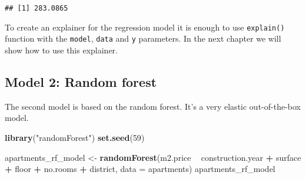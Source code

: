 \documentclass[]{book}
\newenvironment{Shaded}{\begin{snugshade}}{\end{snugshade}}
\newcommand{\DataTypeTok}[1]{\textcolor[rgb]{0.13,0.29,0.53}{#1}}
\newcommand{\DecValTok}[1]{\textcolor[rgb]{0.00,0.00,0.81}{#1}}
\newcommand{\KeywordTok}[1]{\textcolor[rgb]{0.13,0.29,0.53}{\textbf{#1}}}
\newcommand{\NormalTok}[1]{#1}
\newcommand{\OperatorTok}[1]{\textcolor[rgb]{0.81,0.36,0.00}{\textbf{#1}}}
\newcommand{\StringTok}[1]{\textcolor[rgb]{0.31,0.60,0.02}{#1}}
\theoremstyle{definition}
\theoremstyle{definition}
\theoremstyle{definition}
\theoremstyle{remark}
\begin{document}
\begin{Shaded}
\end{Shaded}

\begin{verbatim}
## [1] 283.0865
\end{verbatim}

To create an explainer for the regression model it is enough to use
\texttt{explain()} function with the \texttt{model}, \texttt{data} and
\texttt{y} parameters. In the next chapter we will show how to use this
explainer.

\begin{Shaded}
\end{Shaded}

\hypertarget{model-2-random-forest}{%
\subsection{Model 2: Random forest}\label{model-2-random-forest}}

The second model is based on the random forest. It's a very elastic
out-of-the-box model.

\begin{Shaded}
\begin{Highlighting}[]
\KeywordTok{library}\NormalTok{(}\StringTok{"randomForest"}\NormalTok{)}
\KeywordTok{set.seed}\NormalTok{(}\DecValTok{59}\NormalTok{)}

\NormalTok{apartments_rf_model <-}\StringTok{ }\KeywordTok{randomForest}\NormalTok{(m2.price }\OperatorTok{~}\StringTok{ }\NormalTok{construction.year }\OperatorTok{+}\StringTok{ }\NormalTok{surface }\OperatorTok{+}\StringTok{ }\NormalTok{floor }\OperatorTok{+}\StringTok{ }
\StringTok{                      }\NormalTok{no.rooms }\OperatorTok{+}\StringTok{ }\NormalTok{district, }\DataTypeTok{data =}\NormalTok{ apartments)}
\NormalTok{apartments_rf_model}
\end{Highlighting}
\end{Shaded}
\end{document}
